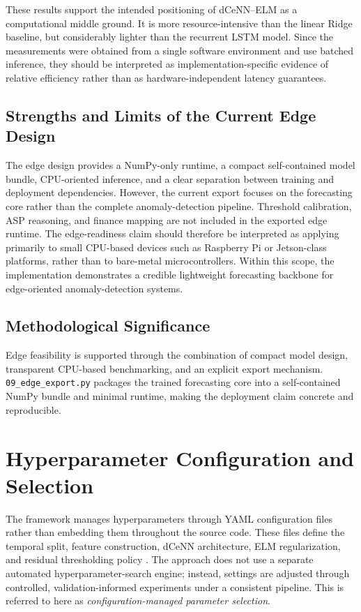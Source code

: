 These results support the intended positioning of dCeNN--ELM as a computational
middle ground. It is more resource-intensive than the linear Ridge baseline, but
considerably lighter than the recurrent LSTM model. Since the measurements were
obtained from a single software environment and use batched inference, they
should be interpreted as implementation-specific evidence of relative efficiency
rather than as hardware-independent latency guarantees.



\subsection{Strengths and Limits of the Current Edge Design}

The edge design provides a NumPy-only runtime, a compact self-contained model bundle, CPU-oriented inference, and a clear separation between training and deployment dependencies. However, the current export focuses on the forecasting core rather than the complete anomaly-detection pipeline. Threshold calibration, ASP reasoning, and finance mapping are not included in the exported edge runtime. The edge-readiness claim should therefore be interpreted as applying primarily to small CPU-based devices such as Raspberry Pi or Jetson-class platforms, rather than to bare-metal microcontrollers. Within this scope, the implementation demonstrates a credible lightweight forecasting backbone for edge-oriented anomaly-detection systems.

\subsection{Methodological Significance}

Edge feasibility is supported through the combination of compact model design, transparent CPU-based benchmarking, and an explicit export mechanism. \texttt{09\_edge\_export.py} packages the trained forecasting core into a self-contained NumPy bundle and minimal runtime, making the deployment claim concrete and reproducible.


\section{Hyperparameter Configuration and Selection}
\label{sec:hyperparameter_optimization}

The framework manages hyperparameters through YAML configuration files rather than embedding them throughout the source code. These files define the temporal split, feature construction, dCeNN architecture, ELM regularization, and residual thresholding policy \cite{repo_thesis_grid_anomaly}. The approach does not use a separate automated hyperparameter-search engine; instead, settings are adjusted through controlled, validation-informed experiments under a consistent pipeline. This is referred to here as \emph{configuration-managed parameter selection}. 

